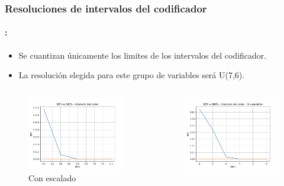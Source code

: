 \begin{frame}
  \frametitle{\textbf{Resoluciones de intervalos del codificador}}
      \framesubtitle{\secname : \subsecname}

    \begin{block}{}
    \begin{itemize}
    \item Se cuantizan únicamente los limites de los intervalos del codificador.
    \item La resolución elegida para este grupo de variables será U(7,6).
    \end{itemize}
    \end{block}
    \vspace{-0.3cm}
    \begin{columns}
    \begin{column}{0.48\paperwidth}
     \begin{figure}
     \centering
    \includegraphics[width=\textwidth]{Graficos/cuantization.png}%
    \caption{Con escalado}
    \end{figure}
    \end{column}
    \begin{column}{0.48\paperwidth}  
    \begin{figure}
    \centering
    \includegraphics[width=\textwidth]{Graficos/cuantization4.png}%

\end{figure}
\end{column}
\end{columns}
\end{frame}
